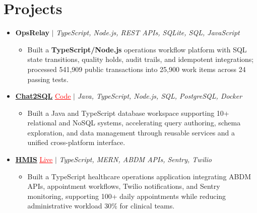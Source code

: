 \documentclass[letterpaper,10pt]{article}
\newcommand{\itemTail}{\vspace{-4pt}}
\newcommand{\projGap}{\vspace{3pt}}
\newcommand{\resumeItem}[1]{\item\small{{#1 \itemTail}}}
\newcommand{\resumeProjectHeading}[1]{\item \small #1 \vspace{-2pt}}
\newcommand{\resumeProjectLink}[2]{\href{#1}{\textcolor{red}{\underline{#2}}}}
\newcommand{\resumeSubHeadingListStart}{\begin{itemize}[leftmargin=0.0in, label={}]}
\newcommand{\resumeSubHeadingListEnd}{\end{itemize}}
\newcommand{\resumeProjItemListStart}{\begin{itemize}[leftmargin=0.15in,label=\textbullet,itemsep=3pt,topsep=0pt,parsep=0pt,partopsep=0pt]}
\newcommand{\resumeProjItemListEnd}{\end{itemize}\vspace{-4pt}}
\begin{document}
\section{Projects}
\resumeSubHeadingListStart
\vspace{3pt}
\resumeProjectHeading{\textbf{OpsRelay} $|$ \emph{TypeScript, Node.js, REST APIs, SQLite, SQL, JavaScript}}
\resumeProjItemListStart
\resumeItem{Built a \textbf{TypeScript/Node.js} operations workflow platform with SQL state transitions, quality holds, audit trails, and idempotent integrations; processed 541,909 public transactions into 25,900 work items across 24 passing tests.}
\resumeProjItemListEnd
\projGap
\resumeProjectHeading{\href{https://github.com/SAHAJ-BHADJA/Chat2SQL}{\textbf{Chat2SQL}} \resumeProjectLink{https://github.com/SAHAJ-BHADJA/Chat2SQL}{Code} $|$ \emph{Java, TypeScript, Node.js, SQL, PostgreSQL, Docker}}
\resumeProjItemListStart
\resumeItem{Built a Java and TypeScript database workspace supporting 10+ relational and NoSQL systems, accelerating query authoring, schema exploration, and data management through reusable services and a unified cross-platform interface.}
\resumeProjItemListEnd
\projGap
\resumeProjectHeading{\href{https://hims-rouge.vercel.app/}{\textbf{HMIS}} \resumeProjectLink{https://hims-rouge.vercel.app/}{Live} $|$ \emph{TypeScript, MERN, ABDM APIs, Sentry, Twilio}}
\resumeProjItemListStart
\resumeItem{Built a TypeScript healthcare operations application integrating ABDM APIs, appointment workflows, Twilio notifications, and Sentry monitoring, supporting 100+ daily appointments while reducing administrative workload 30\% for clinical teams.}
\resumeProjItemListEnd
\resumeSubHeadingListEnd
\end{document}
